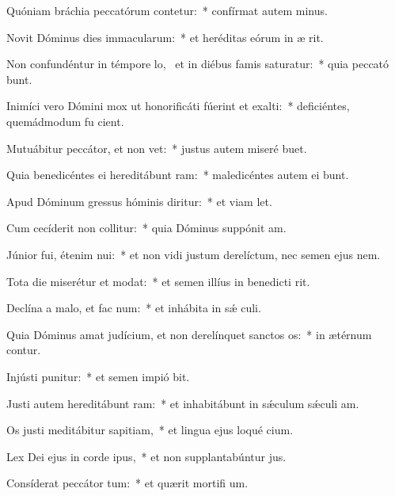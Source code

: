 \item Quóniam bráchia peccatórum contetur:~* confírmat autem  minus.
\item Novit Dóminus dies immacularum:~* et heréditas eórum in æ rit.
\item Non confundéntur in témpore lo,~\pscross{} et in diébus famis saturatur:~* quia peccató bunt.
\item Inimíci vero Dómini mox ut honorificáti fúerint et exalti:~* deficiéntes, quemádmodum fu cient.
\item Mutuábitur peccátor, et non vet:~* justus autem miseré  buet.
\item Quia benedicéntes ei hereditábunt ram:~* maledicéntes autem ei bunt.
\item Apud Dóminum gressus hóminis diritur:~* et viam  let.
\item Cum cecíderit non collitur:~* quia Dóminus suppónit  am.
\item Júnior fui, étenim nui:~* et non vidi justum derelíctum, nec semen ejus  nem.
\item Tota die miserétur et modat:~* et semen illíus in benedicti rit.
\item Declína a malo, et fac num:~* et inhábita in sǽ culi.
\item Quia Dóminus amat judícium, et non derelínquet sanctos os:~* in ætérnum contur.
\item Injústi punitur:~* et semen impió bit.
\item Justi autem hereditábunt ram:~* et inhabitábunt in sǽculum sǽculi  am.
\item Os justi meditábitur sapitiam,~* et lingua ejus loqué cium.
\item Lex Dei ejus in corde ipus,~* et non supplantabúntur  jus.
\item Consíderat peccátor tum:~* et quærit mortifi um.
